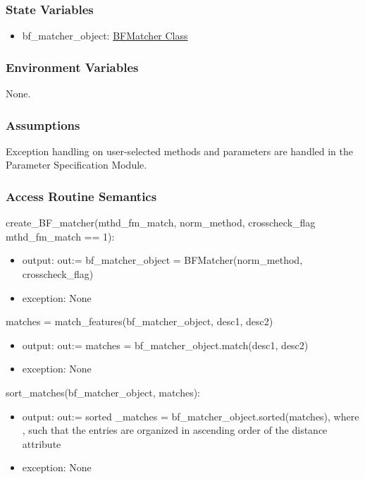 \documentclass[12pt, titlepage]{article}
\begin{document}
\subsubsection{State Variables}
\begin{itemize}
  \item bf\_matcher\_object: \href{https://docs.opencv.org/3.4/d3/da1/classcv_1_1BFMatcher.html}{BFMatcher Class}
\end{itemize}
\subsubsection{Environment Variables}

None.

\subsubsection{Assumptions}

Exception handling on user-selected methods and parameters are handled in the Parameter 
Specification Module.

\subsubsection{Access Routine Semantics}

create\_BF\_matcher(mthd\_fm\_match, norm\_method, crosscheck\_flag 
\textbar \: mthd\_fm\_match == 1):
\begin{itemize}
  \item output: out:= bf\_matcher\_object = BFMatcher(norm\_method, 
  crosscheck\_flag) 
  \item exception: None
\end{itemize} 
matches = match\_features(bf\_matcher\_object, desc1, desc2) 
\begin{itemize}
  \item output: out:= matches = bf\_matcher\_object.match(desc1, desc2)
  \item exception: None
\end{itemize}
sort\_matches(bf\_matcher\_object, matches):\newline
\begin{itemize}
  \item output: out:= sorted \_matches = bf\_matcher\_object.sorted(matches), where , such that the entries
  are organized in ascending order of the distance attribute
  \item exception: None
\end{itemize}
\end{document}

